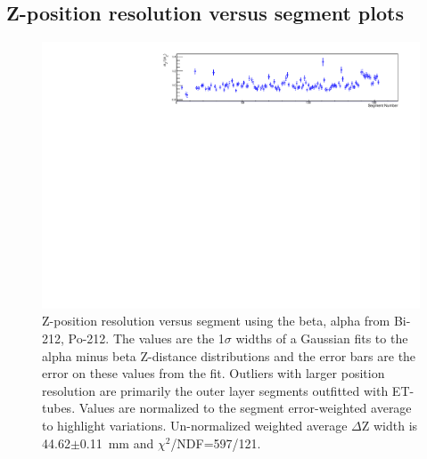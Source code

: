 \subsection{Z-position resolution versus segment plots}
\begin{figure}[!h]
\centering
\includegraphics[width=1.05\textwidth]{figures/PubBiPo212dZWidthvsCell.pdf}
\caption{\label{fig:ZresvsCell212}Z-position resolution versus segment using the beta, alpha from Bi-212, Po-212. The values are the 1$\sigma$ widths of a Gaussian fits to the alpha minus beta Z-distance distributions and the error bars are the error on these values from the fit. Outliers with larger position resolution are primarily the outer layer segments outfitted with ET-tubes. Values are normalized to the segment error-weighted average to highlight variations. Un-normalized weighted average $\Delta$Z width is 44.62$\pm$0.11~mm and $\chi^2$/NDF=597/121.}
\end{figure}
